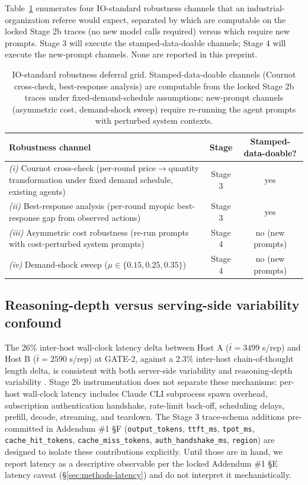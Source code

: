 Table~\ref{tab:io-robustness-deferral} enumerates four IO-standard robustness channels that an industrial-organization referee would expect, separated by which are computable on the locked Stage 2b traces (no new model calls required) versus which require new prompts. Stage 3 will execute the stamped-data-doable channels; Stage 4 will execute the new-prompt channels. None are reported in this preprint.

\begin{table}[h]
\centering
\caption{IO-standard robustness deferral grid. Stamped-data-doable channels (Cournot cross-check, best-response analysis) are computable from the locked Stage 2b traces under fixed-demand-schedule assumptions; new-prompt channels (asymmetric cost, demand-shock sweep) require re-running the agent prompts with perturbed system contexts.}
\label{tab:io-robustness-deferral}
\begin{tabular}{p{4.0cm}cc}
\toprule
Robustness channel & Stage & Stamped-data-doable? \\
\midrule
\emph{(i)} Cournot cross-check (per-round price$\to$quantity transformation under fixed demand schedule, existing agents) & Stage 3 & yes \\
\emph{(ii)} Best-response analysis (per-round myopic best-response gap from observed actions) & Stage 3 & yes \\
\emph{(iii)} Asymmetric cost robustness (re-run prompts with cost-perturbed system prompts) & Stage 4 & no (new prompts) \\
\emph{(iv)} Demand-shock sweep ($\mu \in \{0.15, 0.25, 0.35\}$) & Stage 4 & no (new prompts) \\
\bottomrule
\end{tabular}
\end{table}

\subsection{Reasoning-depth versus serving-side variability confound}
\label{sec:limitations-confound}

The 26\% inter-host wall-clock latency delta between Host A ($\bar{t} = 3499$ s/rep) and Host B ($\bar{t} = 2590$ s/rep) at GATE-2, against a 2.3\% inter-host chain-of-thought length delta, is consistent with both server-side variability \citep{kwon2023pagedattention,zheng2023sglang,patel2023splitwise} and reasoning-depth variability \citep{snell2024testtimecompute,holmes2024deepspeedfastgen}. Stage 2b instrumentation does not separate these mechanisms: per-host wall-clock latency includes Claude CLI subprocess spawn overhead, subscription authentication handshake, rate-limit back-off, scheduling delays, prefill, decode, streaming, and teardown. The Stage 3 trace-schema additions pre-committed in Addendum \#1 \S F (\texttt{output\_tokens}, \texttt{ttft\_ms}, \texttt{tpot\_ms}, \texttt{cache\_hit\_tokens}, \texttt{cache\_miss\_tokens}, \texttt{auth\_handshake\_ms}, \texttt{region}) are designed to isolate these contributions explicitly. Until those are in hand, we report latency as a descriptive observable per the locked Addendum \#1 \S E latency caveat (\S\ref{sec:methods-latency}) and do not interpret it mechanistically.

